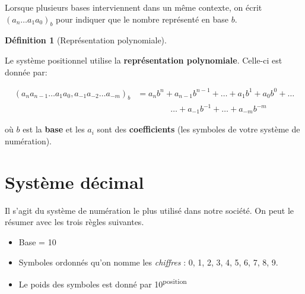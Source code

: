 \documentclass[
  letterpaper,
]{scrbook}
\providecommand{\tightlist}{%
  \setlength{\itemsep}{0pt}\setlength{\parskip}{0pt}}\usepackage{longtable,booktabs,array}
\theoremstyle{plain}
\theoremstyle{definition}
\newtheorem{definition}{Définition}[chapter]
\theoremstyle{definition}
\theoremstyle{remark}
\begin{document}
\begin{tcolorbox}[enhanced jigsaw, colbacktitle=quarto-callout-note-color!10!white, toptitle=1mm, left=2mm, toprule=.15mm, opacityback=0, bottomrule=.15mm, breakable, coltitle=black, title=\textcolor{quarto-callout-note-color}{\faInfo}\hspace{0.5em}{Note}, colframe=quarto-callout-note-color-frame, arc=.35mm, titlerule=0mm, rightrule=.15mm, opacitybacktitle=0.6, leftrule=.75mm, bottomtitle=1mm, colback=white]

Lorsque plusieurs bases interviennent dans un même contexte, on écrit
\((a_n \ldots a_1a_0)_b\) pour indiquer que le nombre représenté en base
\(b\).

\end{tcolorbox}

\begin{definition}[Représentation
polynomiale]\protect\hypertarget{def-representation-polynomiale}{}\label{def-representation-polynomiale}

Le système positionnel utilise la \textbf{représentation polynomiale}.
Celle-ci est donnée par:

\[
\begin{aligned}
(a_na_{n-1}\ldots a_1a_0,a_{-1}a_{-2}\ldots a_{-m})_b &= a_nb^n+a_{n-1}b^{n-1}+\ldots +a_1b^1+a_0b^0+\ldots \\
& \qquad \qquad \ldots + a_{-1}b^{-1}+\ldots +a_{-m}b^{-m}
\end{aligned}
\]

où \(b\) est la \textbf{base} et les \(a_i\) sont des
\textbf{coefficients} (les symboles de votre système de numération).

\end{definition}

\hypertarget{systuxe8me-duxe9cimal}{%
\section{Système décimal}\label{systuxe8me-duxe9cimal}}

Il s'agit du système de numération le plus utilisé dans notre société.
On peut le résumer avec les trois règles suivantes.

\begin{itemize}
\tightlist
\item
  Base = 10
\item
  Symboles ordonnés qu'on nomme les \emph{chiffres} : 0, 1, 2, 3, 4, 5,
  6, 7, 8, 9.
\item
  Le poids des symboles est donné par 10\textsuperscript{position}
\end{itemize}
\end{document}
